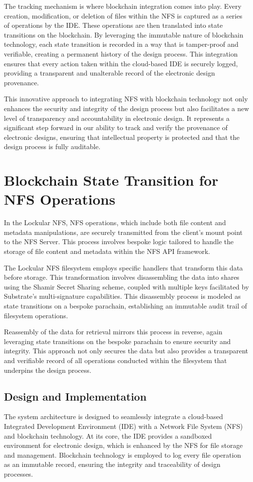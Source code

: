 \documentclass{tufte-handout}
\begin{document}
The tracking mechanism is where blockchain integration comes into play. Every creation, modification, or deletion of files within the NFS is captured as a
series of operations by the IDE. These operations are then translated into state transitions on the blockchain. By leveraging the immutable nature of
blockchain technology, each state transition is recorded in a way that is tamper-proof and verifiable, creating a permanent history of the design process.
This integration ensures that every action taken within the cloud-based IDE is securely logged, providing a transparent and unalterable record of the electronic
design provenance.

This innovative approach to integrating NFS with blockchain technology not only enhances the security and integrity of the design process but also
facilitates a new level of transparency and accountability in electronic design. It represents a significant step forward in our ability to track and
verify the provenance of electronic designs, ensuring that intellectual property is protected and that the design process is fully auditable.

\section{Blockchain State Transition for NFS Operations}
In the Lockular NFS, NFS operations, which include both file content and metadata manipulations, are securely transmitted from the client's mount
point to the NFS Server. This process involves bespoke logic tailored to handle the storage of file content and metadata within the NFS API framework.

The Lockular NFS filesystem employs specific handlers that transform this data before storage. This transformation involves disassembling the data into
shares using the Shamir Secret Sharing scheme, coupled with multiple keys facilitated by Substrate's multi-signature capabilities. This disassembly
process is modeled as state transitions on a bespoke parachain, establishing an immutable audit trail of filesystem operations.

Reassembly of the data for retrieval mirrors this process in reverse, again leveraging state transitions on the bespoke parachain to
ensure security and integrity. This approach not only secures the data but also provides a transparent and verifiable record of all operations conducted
within the filesystem that underpins the design process.

\subsection{Design and Implementation}
The system architecture is designed to seamlessly integrate a cloud-based Integrated Development Environment (IDE) with a Network File System (NFS) and
blockchain technology. At its core, the IDE provides a sandboxed environment for electronic design, which is enhanced by the NFS for file storage and management.
Blockchain technology is employed to log every file operation as an immutable record, ensuring the integrity and traceability of design processes.
\end{document}
